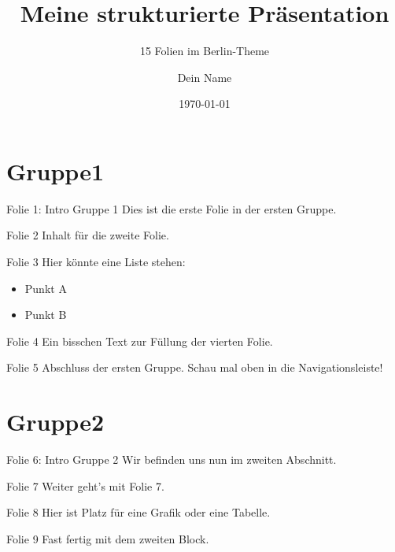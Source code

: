 \documentclass{beamer}
\title{Meine strukturierte Präsentation}
\subtitle{15 Folien im Berlin-Theme}
\author{Dein Name}
\date{\today}
\begin{document}
\begin{frame}
    \titlepage
\end{frame}

\section{Gruppe1}

\begin{frame}{Folie 1: Intro Gruppe 1}
    Dies ist die erste Folie in der ersten Gruppe.
\end{frame}

\begin{frame}{Folie 2}
    Inhalt für die zweite Folie.
\end{frame}


\begin{frame}{Folie 3}
    Hier könnte eine Liste stehen:
    \begin{itemize}
        \item Punkt A
        \item Punkt B
    \end{itemize}
\end{frame}

\begin{frame}{Folie 4}
    Ein bisschen Text zur Füllung der vierten Folie.
\end{frame}

\begin{frame}{Folie 5}
    Abschluss der ersten Gruppe. Schau mal oben in die Navigationsleiste!
\end{frame}


\section{Gruppe2}

\begin{frame}{Folie 6: Intro Gruppe 2}
    Wir befinden uns nun im zweiten Abschnitt.
\end{frame}

\begin{frame}{Folie 7}
    Weiter geht's mit Folie 7.
\end{frame}

\begin{frame}{Folie 8}
    Hier ist Platz für eine Grafik oder eine Tabelle.
\end{frame}

\begin{frame}{Folie 9}
    Fast fertig mit dem zweiten Block.
\end{frame}
\end{document}
